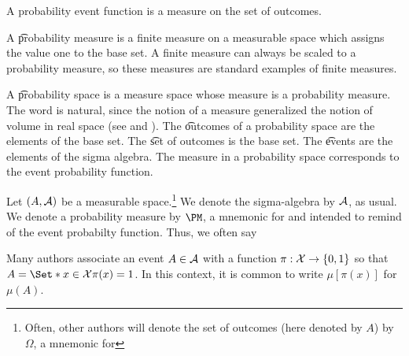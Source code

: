 

A probability event function is a measure on the set of outcomes.


A \t{probability measure} is a finite measure on a measurable space which assigns the value one to the base set.
A finite measure can always be scaled to a probability measure, so these measures are standard examples of finite measures.

A \t{probability space} is a measure space whose measure is a probability measure.
The word  is natural, since the notion of a measure generalized the notion of volume in real space (see  and ).
The \t{outcomes} of a probability space are the elements of the base set.
The \t{set of outcomes} is the base set.
The \t{events} are the elements of the sigma algebra.
The measure in a probability space corresponds to the event probability function.



Let $(A, \mathcal{A})$ be a measurable space.\footnote{Often, other authors will denote the set of outcomes (here denoted by $A$) by $\Omega$, a mnemonic for }
We denote the sigma-algebra by $\mathcal{A}$, as usual.
We denote a probability measure by $\PM$, a mnemonic for  and intended to remind of the event probabilty function.
Thus, we often say 


Many authors associate an event $A \in \mathcal{A}$ with a function $\pi: \mathcal{X} \to \{0, 1\}$ so that $A = \Set*{x \in \CX}{\pi(x) = 1}$.
In this context, it is common to write $\mu[\pi(x)]$ for $\mu(A)$.

